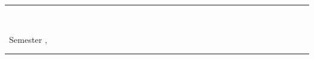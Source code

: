 \thispagestyle{empty}
\newcommand{\horrule}[1]{\rule{\linewidth}{#1}} 	%
\makeatletter 								%
\begin{center}
\horrule{0.5pt} \\[0.2cm]
\huge
\textbf{\usqcoursecode{} \usqcoursedescription{}}

\vspace{0.5cm}
\Large
\@title

\vspace{0.2cm}
\small
\@date{}
\textbullet \ Semester \usqacademicsemester{}, \usqacademicyear{}


\horrule{2pt} \\[0.2cm]
	
\normalsize
\@author{}
\textbullet \ \usqstudentnumber{}
\textbullet \ \usqstudentemail{}

\vspace{0.5cm
}
\normalsize

\end{center}
\makeatother